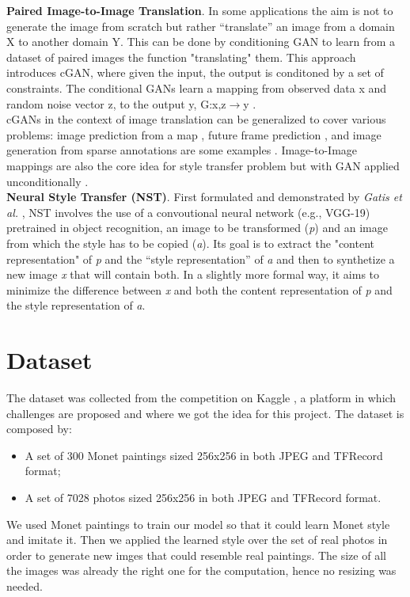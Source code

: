 \documentclass[10pt,twocolumn,letterpaper]{article}
\begin{document}
\textbf{Paired Image-to-Image Translation}. In some applications the aim is not to generate the image from scratch but rather “translate” an image from a domain X to another domain Y. This can be done by conditioning GAN to learn from a dataset of paired images the function "translating" them. This approach introduces cGAN, where given the input, the output is conditoned by a set of constraints. The conditional GANs learn a mapping from observed data x and random noise vector z, to the output y, G:{x,z}$\rightarrow$y \cite{imgtoimg}.\\
cGANs in the context of image translation can be generalized to cover various problems: image prediction from a map \cite{example1}, future frame prediction \cite{example2}, and image generation from sparse annotations are some examples \cite{example3}. Image-to-Image mappings are also the core idea for style transfer problem but with GAN applied unconditionally \cite{example4}.\\

\textbf{Neural Style Transfer (NST)}. First formulated and demonstrated by \textit{Gatis et al.} \cite{NST}, NST involves the use of a convoutional neural network (e.g., VGG-19) pretrained in object recognition, an image to be transformed (\textit{p}) and an image from which the style has to be copied (\textit{a}). Its goal is to extract the "content representation" of \textit{p} and the  “style representation” of \textit{a} and then to synthetize a new image \textit{x} that will contain both. In a slightly more formal way, it aims to minimize the difference between  \textit{x} and both the content representation of \textit{p} and the style representation of \textit{a}.

\section{Dataset}

The dataset was collected from the competition on Kaggle \cite{kaggle}, a platform in which challenges are proposed and where we got the idea for this project. The dataset is composed by:
\begin{itemize}
\item A set of 300 Monet paintings sized 256x256 in both JPEG and TFRecord format;
\item A set of 7028 photos sized 256x256 in both JPEG and TFRecord format.
\end{itemize}
We used Monet paintings to train our model so that it could learn Monet style and imitate it. Then we applied the learned style over the set of real photos in order to generate new imges that could resemble real paintings. The size of all the images was already the right one for the computation, hence no resizing was needed. 
\end{document}
